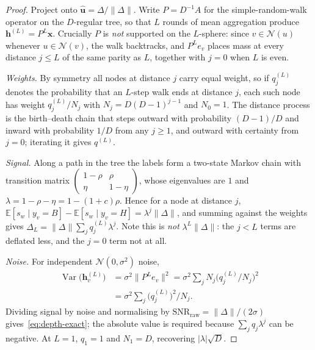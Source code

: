 \documentclass[onecolumn,pdflatex,sn-basic,Numbered]{sn-jnl}
\theoremstyle{thmstyleone}
\theoremstyle{thmstylethree}
\begin{document}
\begin{appendices}
\begin{proof}
Project onto $\hat{\mathbf{u}} = \Delta/\|\Delta\|$. Write $P = D^{-1}A$ for the
simple-random-walk operator on the $D$-regular tree, so that $L$ rounds of mean
aggregation produce $\mathbf{h}^{(L)} = P^{L}\mathbf{x}$. Crucially $P$ is
\emph{not} supported on the $L$-sphere: since $v \in \mathcal{N}(u)$ whenever
$u \in \mathcal{N}(v)$, the walk backtracks, and $P^L e_v$ places mass at every
distance $j \le L$ of the same parity as $L$, together with $j=0$ when $L$ is even.

\emph{Weights.} By symmetry all nodes at distance $j$ carry equal weight, so if
$q^{(L)}_j$ denotes the probability that an $L$-step walk ends at distance $j$, each
such node has weight $q^{(L)}_j/N_j$ with $N_j = D(D-1)^{j-1}$ and $N_0 = 1$. The
distance process is the birth--death chain that steps outward with probability
$(D-1)/D$ and inward with probability $1/D$ from any $j\ge1$, and outward with
certainty from $j=0$; iterating it gives $q^{(L)}$.

\emph{Signal.} Along a path in the tree the labels form a two-state Markov chain with
transition matrix $\begin{pmatrix} 1-\rho & \rho\\ \eta & 1-\eta\end{pmatrix}$, whose
eigenvalues are $1$ and $\lambda = 1-\rho-\eta = 1-(1+c)\rho$. Hence for a node at
distance $j$,
$\mathbb{E}[s_w \mid y_v = B] - \mathbb{E}[s_w \mid y_v = H] = \lambda^{j}\|\Delta\|$,
and summing against the weights gives
$\Delta_L = \|\Delta\|\sum_j q^{(L)}_j \lambda^{j}$. Note this is \emph{not}
$\lambda^L\|\Delta\|$: the $j<L$ terms are deflated less, and the $j=0$ term not at
all.

\emph{Noise.} For independent $\mathcal{N}(0,\sigma^2)$ noise,
\begin{align*}
  \operatorname{Var}\bigl(\mathbf{h}^{(L)}_v\bigr)
  &= \sigma^2\bigl\|P^Le_v\bigr\|^2
  = \sigma^2\sum_j N_j \bigl(q^{(L)}_j/N_j\bigr)^2 \\
  &= \sigma^2\sum_j \bigl(q^{(L)}_j\bigr)^2 / N_j .
\end{align*}
Dividing signal by noise and normalising by
$\mathrm{SNR}_{\mathrm{raw}} = \|\Delta\|/(2\sigma)$ gives~\eqref{eq:depth-exact};
the absolute value is required because $\sum_j q_j\lambda^j$ can be negative.
At $L=1$, $q_1=1$ and $N_1=D$, recovering $|\lambda|\sqrt{D}$.
\end{proof}


\end{appendices}
\end{document}
